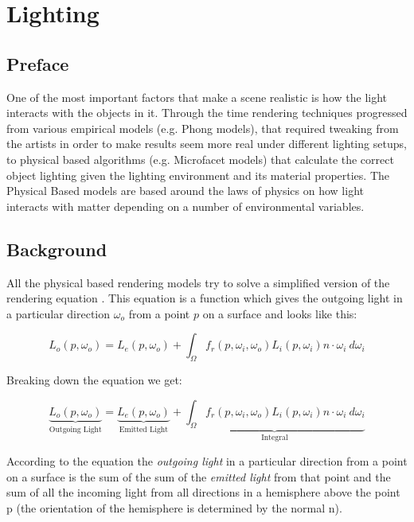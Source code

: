 \section{Lighting}
\subsection{Preface}
One of the most important factors that make a scene realistic is how the light interacts with the objects in it.
Through the time rendering techniques progressed from various empirical models (e.g. Phong models), that required
tweaking from the artists in order to make results seem more real under different lighting setups, to physical based
algorithms (e.g. Microfacet models) that calculate the correct object lighting given the lighting environment and
its material properties. The Physical Based models are based around the laws of physics on how light interacts with
matter depending on a number of environmental variables.

\subsection{Background}
All the physical based rendering models try to solve a simplified version of the rendering equation \cite{lighting:ref32}.
This equation is a function which gives the outgoing light in a particular direction $\omega_o$ from a point $p$ on a surface
and looks like this:

\begin{equation}
\label{eq:rendeq}
L_o(p,\omega_o) = L_e(p, \omega_o) + \int_\Omega f_r(p,\omega_i,\omega_o)L_i(p,\omega_i)n\cdot\omega_i \ d\omega_i
\end{equation}

Breaking down the equation we get:

\begin{equation}
\underbrace{L_o(p,\omega_o)}_\text{Outgoing Light} = \underbrace{L_e(p, \omega_o)}_\text{Emitted Light} + \underbrace{\int_\Omega f_r(p,\omega_i,\omega_o)L_i(p,\omega_i)n\cdot\omega_i \ d\omega_i}_\text{Integral}
\end{equation}

According to the equation the \textit{outgoing light} in a particular direction from a point on a surface is the sum of the
sum of the \textit{emitted light} from that point and the sum of all the incoming light from all directions in a hemisphere
above the point p (the orientation of the hemisphere is determined by the normal n).


